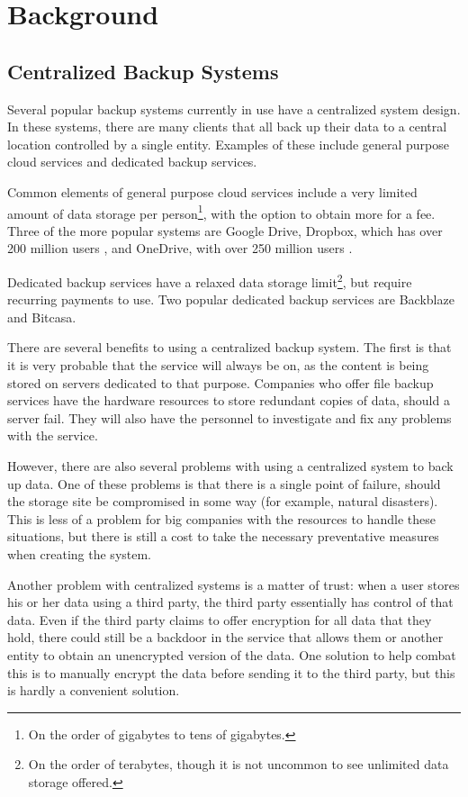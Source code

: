 \documentclass[12pt]{report}
\begin{document}
\chapter{Background} \label{chap:Background}
\section{Centralized Backup Systems}
Several popular backup systems currently in use have a centralized system design. In these systems, there are many clients that all back up their data to a central location controlled by a single entity. Examples of these include general purpose cloud services and dedicated backup services.

Common elements of general purpose cloud services include a very limited amount of data storage per person\footnote{On the order of gigabytes to tens of gigabytes.}, with the option to obtain more for a fee. Three of the more popular systems are Google Drive, Dropbox, which has over 200 million users \cite{dropboxusers}, and OneDrive, with over 250 million users \cite{onedriveusers}.

Dedicated backup services have a relaxed data storage limit\footnote{On the order of terabytes, though it is not uncommon to see unlimited data storage offered.}, but require recurring payments to use. Two popular dedicated backup services are Backblaze and Bitcasa.

There are several benefits to using a centralized backup system. The first is that it is very probable that the service will always be on, as the content is being stored on servers dedicated to that purpose. Companies who offer file backup services have the hardware resources to store redundant copies of data, should a server fail. They will also have the personnel to investigate and fix any problems with the service.

However, there are also several problems with using a centralized system to back up data. One of these problems is that there is a single point of failure, should the storage site be compromised in some way (for example, natural disasters). This is less of a problem for big companies with the resources to handle these situations, but there is still a cost to take the necessary preventative measures when creating the system.

Another problem with centralized systems is a matter of trust: when a user stores his or her data using a third party, the third party essentially has control of that data. Even if the third party claims to offer encryption for all data that they hold, there could still be a backdoor in the service that allows them or another entity to obtain an unencrypted version of the data. One solution to help combat this is to manually encrypt the data before sending it to the third party, but this is hardly a convenient solution.
\end{document}
